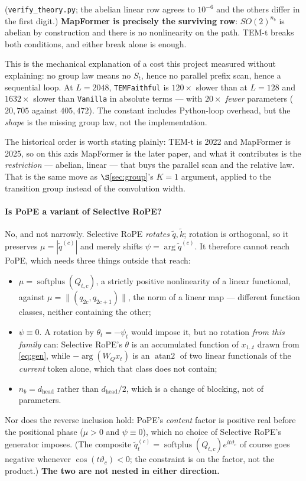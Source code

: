 \documentclass[11pt]{article}
\newcommand{\hd}{d_{\mathrm{head}}}
\newcommand{\nb}{n_b}
\DeclareMathOperator{\softplus}{softplus}
\begin{document}
\noindent (\texttt{verify\_theory.py}; the abelian linear row agrees to
$10^{-6}$ and the others differ in the first digit.) \textbf{MapFormer is precisely
the surviving row}: $SO(2)^{\nb}$ is abelian by construction and there is no
nonlinearity on the path. TEM-t breaks both conditions, and either break alone is
enough.

This is the mechanical explanation of a cost this project measured without
explaining: no group law means no $S_t$, hence no parallel prefix scan, hence a
sequential loop. At $L=2048$, \texttt{TEMFaithful} is $120\times$ slower than at
$L=128$ and $1632\times$ slower than \texttt{Vanilla} in absolute terms --- with
$20\times$ \emph{fewer} parameters ($20{,}705$ against $405{,}472$). The constant
includes Python-loop overhead, but the \emph{shape} is the missing group law, not
the implementation.

The historical order is worth stating plainly: TEM-t is 2022 and MapFormer is 2025,
so on this axis MapFormer is the later paper, and what it contributes is the
\emph{restriction} --- abelian, linear --- that buys the parallel scan and the
relative law. That is the same move as $\S$\ref{sec:group}'s $K=1$ argument, applied
to the transition group instead of the convolution width.

\paragraph{Is PoPE a variant of Selective RoPE?} No, and not narrowly. Selective
RoPE \emph{rotates} $\tilde q,\tilde k$; rotation is orthogonal, so it preserves
$\mu = |\tilde q^{(c)}|$ and merely shifts $\psi = \arg \tilde q^{(c)}$. It
therefore cannot reach PoPE, which needs three things outside that reach:
\begin{itemize}\itemsep2pt
\item $\mu = \softplus(Q_{t,c})$, a strictly positive nonlinearity of a linear
  functional, against $\mu = \lVert(q_{2c},q_{2c+1})\rVert$, the norm of a linear
  map --- different function classes, neither containing the other;
\item $\psi \equiv 0$. A rotation by $\theta_t = -\psi_t$ would impose it, but no
  rotation \emph{from this family} can: Selective RoPE's $\theta$ is an accumulated
  function of $x_{1..t}$ drawn from \eqref{eq:gen}, while $-\arg(W_Qx_t)$ is an
  $\operatorname{atan2}$ of two linear functionals of the \emph{current} token
  alone, which that class does not contain;
\item $\nb = \hd$ rather than $\hd/2$, which is a change of blocking, not of
  parameters.
\end{itemize}
Nor does the reverse inclusion hold: PoPE's \emph{content} factor is positive real before the positional phase ($\mu>0$ and $\psi\equiv0$), which no choice of Selective RoPE's generator imposes. (The composite $\tilde q^{(c)}_t = \softplus(Q_{t,c})e^{it\vartheta_c}$ of course goes negative whenever $\cos(t\vartheta_c)<0$; the constraint is on the factor, not the product.)
\textbf{The two are not nested in either direction.}
\end{document}
